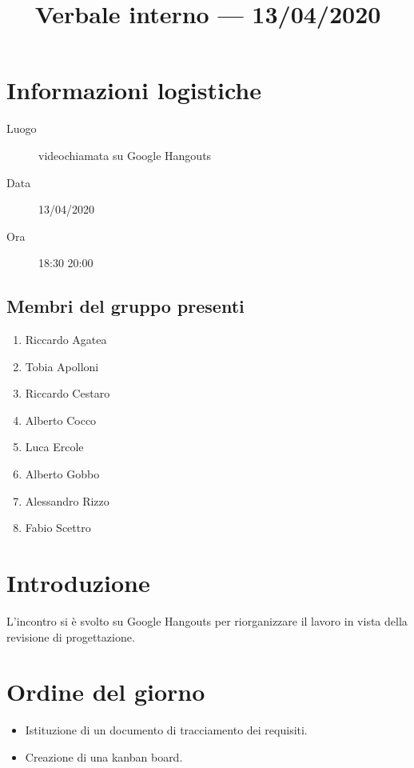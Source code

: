 \documentclass{article}
\title{Verbale interno --- 13/04/2020}
\begin{document}


\section{Informazioni logistiche}%
\label{sec:informazioni_logistiche}

\begin{description}
  \item [Luogo] videochiamata su Google Hangouts
  \item [Data] 13/04/2020
  \item [Ora] 18:30  20:00
\end{description}

\subsection{Membri del gruppo presenti}%
\label{sub:membri_del_gruppo_presenti}

\begin{enumerate}
  \item Riccardo Agatea
  \item Tobia Apolloni
  \item Riccardo Cestaro
  \item Alberto Cocco
  \item Luca Ercole
  \item Alberto Gobbo
  \item Alessandro Rizzo
  \item Fabio Scettro
\end{enumerate}

\section{Introduzione}%
\label{sec:introduzione}

L'incontro si è svolto su Google Hangouts per riorganizzare il lavoro in vista della revisione di progettazione.

\section{Ordine del giorno}%
\label{sec:ordine_del_giorno}
\begin{itemize}
  \item Istituzione di un documento di tracciamento dei requisiti.
  \item Creazione di una kanban board.
\end{itemize}
\end{document}
